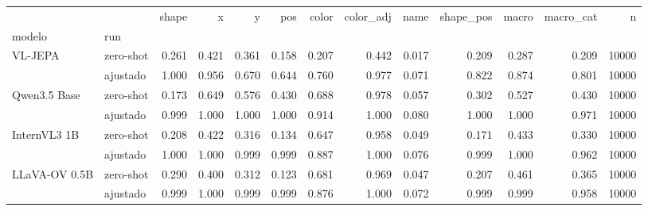 \begin{tabular}{llrrrrrrrrrrr}
\toprule
 &  & shape & x & y & pos & color & color\_adj & name & shape\_pos & macro & macro\_cat & n \\
modelo & run &  &  &  &  &  &  &  &  &  &  &  \\
\midrule
\multirow[t]{2}{*}{VL-JEPA} & zero-shot & 0.261 & 0.421 & 0.361 & 0.158 & 0.207 & 0.442 & 0.017 & 0.209 & 0.287 & 0.209 & 10000 \\
 & ajustado & 1.000 & 0.956 & 0.670 & 0.644 & 0.760 & 0.977 & 0.071 & 0.822 & 0.874 & 0.801 & 10000 \\
\cline{1-13}
\multirow[t]{2}{*}{Qwen3.5 Base} & zero-shot & 0.173 & 0.649 & 0.576 & 0.430 & 0.688 & 0.978 & 0.057 & 0.302 & 0.527 & 0.430 & 10000 \\
 & ajustado & 0.999 & 1.000 & 1.000 & 1.000 & 0.914 & 1.000 & 0.080 & 1.000 & 1.000 & 0.971 & 10000 \\
\cline{1-13}
\multirow[t]{2}{*}{InternVL3 1B} & zero-shot & 0.208 & 0.422 & 0.316 & 0.134 & 0.647 & 0.958 & 0.049 & 0.171 & 0.433 & 0.330 & 10000 \\
 & ajustado & 1.000 & 1.000 & 0.999 & 0.999 & 0.887 & 1.000 & 0.076 & 0.999 & 1.000 & 0.962 & 10000 \\
\cline{1-13}
\multirow[t]{2}{*}{LLaVA-OV 0.5B} & zero-shot & 0.290 & 0.400 & 0.312 & 0.123 & 0.681 & 0.969 & 0.047 & 0.207 & 0.461 & 0.365 & 10000 \\
 & ajustado & 0.999 & 1.000 & 0.999 & 0.999 & 0.876 & 1.000 & 0.072 & 0.999 & 0.999 & 0.958 & 10000 \\
\cline{1-13}
\bottomrule
\end{tabular}
